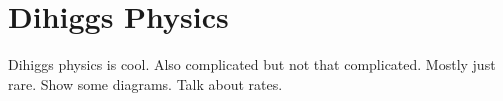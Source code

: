 \section{Dihiggs Physics}
\label{sec:physics}

Dihiggs physics is cool. Also complicated but not that complicated. Mostly just rare. Show some diagrams. Talk about rates.
